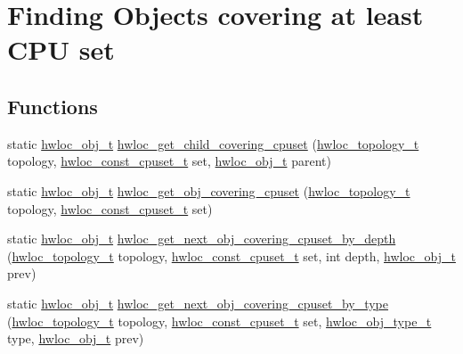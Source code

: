 \hypertarget{a00196}{}\section{Finding Objects covering at least C\+PU set}
\label{a00196}
\subsection*{Functions}
\begin{DoxyCompactItemize}
\item 
static \hyperlink{a00185_ga79b8ab56877ef99ac59b833203391c7d}{hwloc\+\_\+obj\+\_\+t} \hyperlink{a00196_ga0e66aa2dc6b2527cfd10723af646c9d7}{hwloc\+\_\+get\+\_\+child\+\_\+covering\+\_\+cpuset} (\hyperlink{a00186_ga9d1e76ee15a7dee158b786c30b6a6e38}{hwloc\+\_\+topology\+\_\+t} topology, \hyperlink{a00183_ga1f784433e9b606261f62d1134f6a3b25}{hwloc\+\_\+const\+\_\+cpuset\+\_\+t} set, \hyperlink{a00185_ga79b8ab56877ef99ac59b833203391c7d}{hwloc\+\_\+obj\+\_\+t} parent)
\item 
static \hyperlink{a00185_ga79b8ab56877ef99ac59b833203391c7d}{hwloc\+\_\+obj\+\_\+t} \hyperlink{a00196_ga41acdcdbb8b95d70ecf6c572a3f67dca}{hwloc\+\_\+get\+\_\+obj\+\_\+covering\+\_\+cpuset} (\hyperlink{a00186_ga9d1e76ee15a7dee158b786c30b6a6e38}{hwloc\+\_\+topology\+\_\+t} topology, \hyperlink{a00183_ga1f784433e9b606261f62d1134f6a3b25}{hwloc\+\_\+const\+\_\+cpuset\+\_\+t} set)
\item 
static \hyperlink{a00185_ga79b8ab56877ef99ac59b833203391c7d}{hwloc\+\_\+obj\+\_\+t} \hyperlink{a00196_gaba4b6d86eba1169ced4b0e941d2bb5f0}{hwloc\+\_\+get\+\_\+next\+\_\+obj\+\_\+covering\+\_\+cpuset\+\_\+by\+\_\+depth} (\hyperlink{a00186_ga9d1e76ee15a7dee158b786c30b6a6e38}{hwloc\+\_\+topology\+\_\+t} topology, \hyperlink{a00183_ga1f784433e9b606261f62d1134f6a3b25}{hwloc\+\_\+const\+\_\+cpuset\+\_\+t} set, int depth, \hyperlink{a00185_ga79b8ab56877ef99ac59b833203391c7d}{hwloc\+\_\+obj\+\_\+t} prev)
\item 
static \hyperlink{a00185_ga79b8ab56877ef99ac59b833203391c7d}{hwloc\+\_\+obj\+\_\+t} \hyperlink{a00196_ga91cfae08b092e7966002e15d1e987213}{hwloc\+\_\+get\+\_\+next\+\_\+obj\+\_\+covering\+\_\+cpuset\+\_\+by\+\_\+type} (\hyperlink{a00186_ga9d1e76ee15a7dee158b786c30b6a6e38}{hwloc\+\_\+topology\+\_\+t} topology, \hyperlink{a00183_ga1f784433e9b606261f62d1134f6a3b25}{hwloc\+\_\+const\+\_\+cpuset\+\_\+t} set, \hyperlink{a00184_gacd37bb612667dc437d66bfb175a8dc55}{hwloc\+\_\+obj\+\_\+type\+\_\+t} type, \hyperlink{a00185_ga79b8ab56877ef99ac59b833203391c7d}{hwloc\+\_\+obj\+\_\+t} prev)
\end{DoxyCompactItemize}


